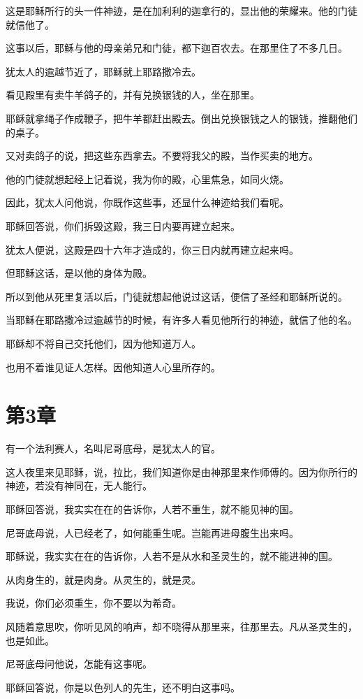 \documentclass[12pt,oneside]{book}
\begin{document}
这是耶稣所行的头一件神迹，是在加利利的迦拿行的，显出他的荣耀来。他的门徒就信他了。

这事以后，耶稣与他的母亲弟兄和门徒，都下迦百农去。在那里住了不多几日。

犹太人的逾越节近了，耶稣就上耶路撒冷去。

看见殿里有卖牛羊鸽子的，并有兑换银钱的人，坐在那里。

耶稣就拿绳子作成鞭子，把牛羊都赶出殿去。倒出兑换银钱之人的银钱，推翻他们的桌子。

又对卖鸽子的说，把这些东西拿去。不要将我父的殿，当作买卖的地方。

他的门徒就想起经上记着说，我为你的殿，心里焦急，如同火烧。

因此，犹太人问他说，你既作这些事，还显什么神迹给我们看呢。

耶稣回答说，你们拆毁这殿，我三日内要再建立起来。

犹太人便说，这殿是四十六年才造成的，你三日内就再建立起来吗。

但耶稣这话，是以他的身体为殿。

所以到他从死里复活以后，门徒就想起他说过这话，便信了圣经和耶稣所说的。

当耶稣在耶路撒冷过逾越节的时候，有许多人看见他所行的神迹，就信了他的名。

耶稣却不将自己交托他们，因为他知道万人。

也用不着谁见证人怎样。因他知道人心里所存的。

\chapter{第3章}
有一个法利赛人，名叫尼哥底母，是犹太人的官。

这人夜里来见耶稣，说，拉比，我们知道你是由神那里来作师傅的。因为你所行的神迹，若没有神同在，无人能行。

耶稣回答说，我实实在在的告诉你，人若不重生，就不能见神的国。

尼哥底母说，人已经老了，如何能重生呢。岂能再进母腹生出来吗。

耶稣说，我实实在在的告诉你，人若不是从水和圣灵生的，就不能进神的国。

从肉身生的，就是肉身。从灵生的，就是灵。

我说，你们必须重生，你不要以为希奇。

风随着意思吹，你听见风的响声，却不晓得从那里来，往那里去。凡从圣灵生的，也是如此。

尼哥底母问他说，怎能有这事呢。

耶稣回答说，你是以色列人的先生，还不明白这事吗。
\end{document}
